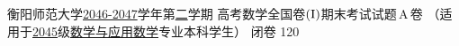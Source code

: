 \documentclass[addtable,twoside,12pt]{hynuexam2024}
\begin{document}

	\examinformation%
	{衡阳师范大学\underline{2046-2047}学年\;第\underline{二}学期}%
	{高考数学全国卷$\left(\mathrm{\Rmnum{1}}\right)$\quad 期末考试试题\,A\,卷}%
	{（适用于\underline{2045}级\underline{数学与应用数学}专业本科学生）}%
	{闭卷}%
	{120}%

	\vspace{-1em}
	\CourseObjectivegradetable



	\vspace*{-0.5em}
\end{document}
